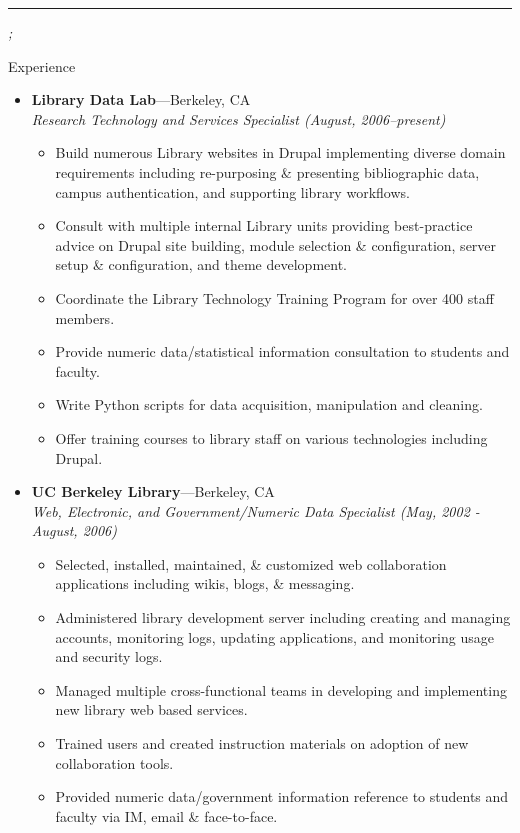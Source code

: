 \documentclass[11pt,oneside]{article}
\newcommand{\bigname}[1]{
	\begin{center}\fontfamily{phv}\selectfont\Huge\scshape#1\end{center}
}
\newenvironment{ressection}[1]{
	\vspace{4pt}
	{\fontfamily{phv}\selectfont\Large#1}
	\begin{itemize}
	\vspace{3pt}
}{
	\end{itemize}
}
\newcommand{\ressubitem}[1]{
	\vspace{-1pt}
	\item \begin{flushleft} #1 \end{flushleft}
}
\newcommand{\resbigitem}[3]{
	\vspace{-5pt}
	\item
	\textbf{#1}---#2 \\
	\textit{#3}
}
\newenvironment{ressubsec}[3]{
	\resbigitem{#1}{#2}{#3}
	\vspace{-2pt}
	\begin{itemize}
}{
	\end{itemize}
}
\begin{document}
 \selectfont

\bigname{\name}

\vspace{-8pt} \rule{\textwidth}{1pt}

\vspace{-1pt} {\small\itshape \addr \hfill \phone; \email}

\vspace{8 pt}

\thispagestyle{empty}





\begin{ressection}{Experience}

	\begin{ressubsec}{Library Data Lab}{Berkeley, CA}{Research Technology and Services Specialist (August, 2006--present)}
		\ressubitem{Build numerous Library websites in Drupal implementing diverse domain requirements including re-purposing \&  presenting  bibliographic data, campus authentication, and supporting library workflows.}
		\ressubitem{Consult with multiple internal Library units providing best-practice advice on Drupal site building, module selection \& configuration, server setup \& configuration, and theme development.}
		\ressubitem{Coordinate the Library Technology Training Program for over 400 staff members.}
		\ressubitem{Provide numeric data/statistical information consultation to students and faculty.}
		\ressubitem{Write Python scripts for data acquisition, manipulation and cleaning.}
		\ressubitem{Offer training courses to library staff on various technologies including Drupal.}
	\end{ressubsec}

	\begin{ressubsec}{UC Berkeley Library}{Berkeley, CA}{Web, Electronic, and Government/Numeric Data Specialist (May, 2002 - August, 2006)}
		\ressubitem{Selected, installed, maintained, \& customized web collaboration applications including wikis, blogs, \& messaging.}
		\ressubitem{Administered library development server including creating and managing accounts, monitoring logs, updating applications, and monitoring usage and security logs.}
		\ressubitem{Managed multiple cross-functional teams in developing and implementing new library web based services.}
		\ressubitem{Trained users and created instruction materials on adoption of new collaboration tools.}
		\ressubitem{Provided numeric data/government information reference to students and faculty via IM, email \& face-to-face.}		
	\end{ressubsec}
	

\end{ressection}
\end{document}
